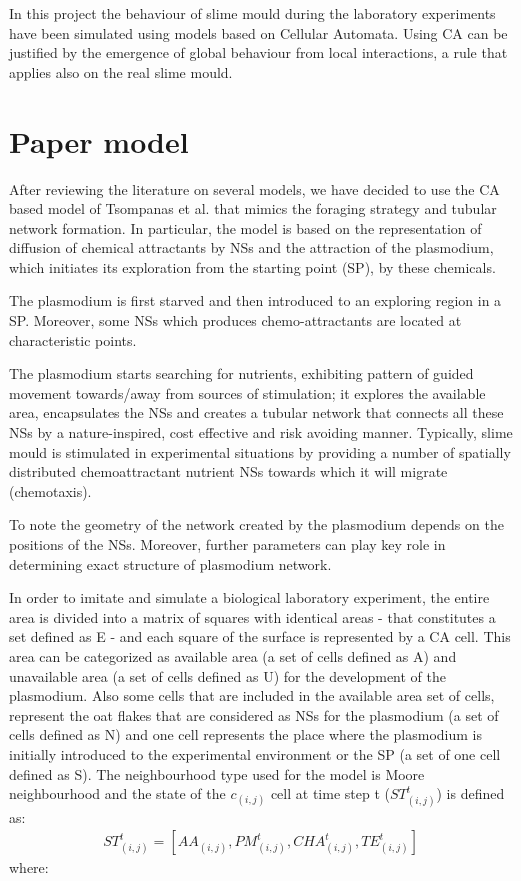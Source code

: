 In this project the behaviour of slime mould during the laboratory experiments have been simulated using models based on Cellular Automata. Using CA can be justified by the emergence of global behaviour from local interactions, a rule that applies also on the real slime mould.

\section{Paper model}

After reviewing the literature on several models, we have decided to use the CA based model of Tsompanas et al. \cite{Tsompanas2016} that mimics the foraging strategy and tubular network formation. In particular, the model is based on the representation of diffusion of chemical attractants by NSs and the attraction of the plasmodium, which initiates its exploration from the starting point (SP), by these chemicals. 

\par
The plasmodium is first starved and then introduced to an exploring region in a SP. Moreover, some NSs which produces chemo-attractants are located at characteristic points. 

\par
The plasmodium starts searching for nutrients, exhibiting pattern of guided movement towards/away from sources of stimulation; it explores the available area, encapsulates the NSs and creates a tubular network that connects all these NSs by a nature-inspired, cost effective and risk avoiding manner.
Typically, slime mould is stimulated in experimental situations by providing a number of spatially distributed chemoattractant nutrient NSs towards which it will migrate (chemotaxis).

\par
To note the geometry of the network created by the plasmodium depends on the positions of the NSs. Moreover, further parameters can play key role in determining exact structure of plasmodium network.

\par
In order to imitate and simulate a biological laboratory experiment, the entire area is divided into a matrix of squares with identical areas - that constitutes a set defined as E - and each square of the surface is represented by a CA cell.
This area can be categorized as available area (a set of cells defined as A) and unavailable area (a set of cells defined as U) for the development of the plasmodium.
Also some cells that are included in the available area set of cells, represent the oat flakes that are considered as NSs for the plasmodium (a set of cells defined as N) and one cell represents the place where the plasmodium is initially introduced to the
experimental environment or the SP (a set of one cell defined as S).
The neighbourhood type used for the model is Moore neighbourhood and the state of the $c_{(i, j)}$ cell at time step t ($ ST^t_{(i, j)}$) is defined as:
\begin{align}
ST^t_{(i, j)} = [AA_{(i, j)}, PM^t_{(i, j)}, CHA^t_{(i, j)}, TE^t_{(i, j)}]
\end{align}
where:

